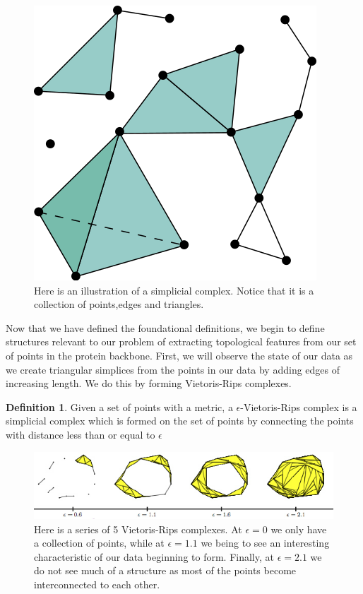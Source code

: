 \documentclass[12pt, a4paper, twocolumn, fullpage]{article}
\theoremstyle{plain}
\theoremstyle{definition}
\newtheorem{defn}{Definition}[section]
\theoremstyle{remark}
\begin{document}
\begin{figure}[t]
    \includegraphics[width=\linewidth]{img/mathDef/simpcomplex}
    \caption{Here is an illustration of a simplicial complex. Notice that it is a collection of points,edges and triangles.}
    \label{simpcomplex}
\end{figure}

Now that we have defined the foundational definitions, we begin to define structures relevant to our problem of extracting topological features from our set of points in the protein backbone. First, we will observe the state of our data as we create triangular simplices from the points in our data by adding edges of increasing length. We do this by forming Vietoris-Rips complexes.

\begin{defn}
Given a set of points with a metric, a $\epsilon$-Vietoris-Rips complex is a simplicial complex which is formed on the set of points  by connecting the points with distance less than or equal to $\epsilon$
\end{defn}

\begin{figure}[t]
    \includegraphics[width=\linewidth]{img/mathDef/ripscomplex.png}
    \caption{Here is a series of 5 Vietoris-Rips complexes. At $\epsilon=0$ we only have a collection of points, while at $\epsilon=1.1$ we being to see an interesting characteristic of our data beginning to form. Finally, at $\epsilon=2.1$ we do not see much of a structure as most of the points become interconnected to each other. }
    \label{}
\end{figure}
\end{document}
